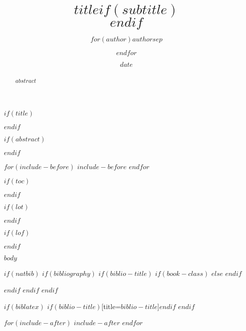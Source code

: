 \documentclass[$if(fontsize)$$fontsize$,$endif$$if(lang)$$lang$,$endif$$if(papersize)$$papersize$,$endif$$for(classoption)$$classoption$$sep$,$endfor$]{$documentclass$}
\title{$title$$if(subtitle)$\\\vspace{0.5em}{\large $subtitle$}$endif$}
\author{$for(author)$$author$$sep$ \and $endfor$}
\date{$date$}
\begin{document}
$if(title)$
    \maketitle
$endif$

$if(abstract)$
\begin{abstract}
    $abstract$
\end{abstract}
$endif$

$for(include-before)$
$include-before$
$endfor$


$if(toc)$
{
    \hypersetup{linkcolor=$if(toccolor)$$toccolor$$else$black$endif$}
    \setcounter{tocdepth}{$toc-depth$}


}
$endif$

$if(lot)$
    \listoftables
$endif$

$if(lof)$
    \listoffigures
$endif$

$body$

$if(natbib)$
    $if(bibliography)$
        $if(biblio-title)$
            $if(book-class)$
              \renewcommand\bibname{$biblio-title$}
            $else$
              \renewcommand\refname{$biblio-title$}
            $endif$
            
        $endif$
    $endif$
$endif$

$if(biblatex)$
    \printbibliography$if(biblio-title)$[title=$biblio-title$]$endif$
$endif$

$for(include-after)$
$include-after$
$endfor$
\end{document}

